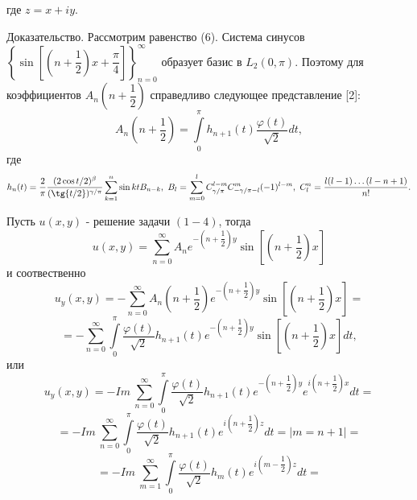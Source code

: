 \documentclass[a4paper, 9pt]{article}
\begin{document}
		где $z = x + iy$. 
		\par
		Доказательство. Рассмотрим равенство (6). Система синусов $\left\{\sin{\left[\left(n +\dfrac12\right)x + \dfrac\pi4\right]}\right\}_{n=0}^{\infty}$ образует базис в $L_2(0,\pi)$. Поэтому для коэффициентов $A_n\left(n+\dfrac12\right)$ справедливо следующее представление [2]:
		\begin{equation*}
			A_n\left(n+\dfrac12\right) = \int\limits_0^\pi h_{n+1}(t) \dfrac{\varphi(t)}{\sqrt2} dt, 
		\end{equation*}
		где
		\begin{equation*}
			h_n(t) = \dfrac{2}{\pi}\dfrac{(2\cos{t/2})^\beta}{(\tg{t/2})^{\gamma/\pi}} \sum\limits_{k=1}^n \sin{kt} B_{n-k}, \ B_{l} = \sum\limits_{m=0}^{l} C_{\gamma/\pi}^{l-m} C_{-\gamma / \pi -l}^{m} (-1)^{l-m}, \ C_l^n = \dfrac{l(l-1)\dots (l-n+1)}{n!}. 
		\end{equation*}
		\par
		Пусть $u(x,y)$ - решение задачи $(1 -4)$, тогда
		\begin{equation*}
			u(x,y) = \sum\limits_{n=0}^{\infty} A_n e^{-\left(n + \dfrac12\right)y} \sin{\left[\left(n + \dfrac12\right)x\right]}
		\end{equation*}
		и соотвественно
		\begin{equation*}
			u_y(x,y) = -\sum\limits_{n=0}^{\infty} A_n \left(n +\dfrac12\right) e^{-\left(n + \dfrac12\right)y} \sin{\left[\left(n + \dfrac12\right)x\right]}=
		\end{equation*}
		\begin{equation*}
		  = - \sum\limits_{n=0}^{\infty}  \int\limits_0^\pi \dfrac{\varphi(t)}{\sqrt2}  h_{n+1}(t)  e^{-\left(n + \dfrac12\right)y} \sin{\left[\left(n + \dfrac12\right)x\right]} dt, 
		\end{equation*}
		или
		\begin{equation*}
			  u_y(x,y) = -  Im \ \sum\limits_{n=0}^{\infty}  \int\limits_0^\pi \dfrac{\varphi(t)}{\sqrt2}  h_{n+1}(t)  e^{-\left(n + \dfrac12\right)y} e^{i\left(n + \dfrac12\right)x} dt = 
		\end{equation*}
		\begin{equation*}
			 = -  Im \ \sum\limits_{n=0}^{\infty}  \int\limits_0^\pi \dfrac{\varphi(t)}{\sqrt2}  h_{n+1}(t)  e^{i\left(n+\dfrac12\right) z}  dt = \vert m = n + 1 \vert = 
		\end{equation*}
		\begin{equation*}
			 = -  Im \ \sum\limits_{m=1}^{\infty}  \int\limits_0^\pi \dfrac{\varphi(t)}{\sqrt2}  h_{m}(t)  e^{i\left(m-\dfrac12\right) z}  dt = 
		\end{equation*}
\end{document}
